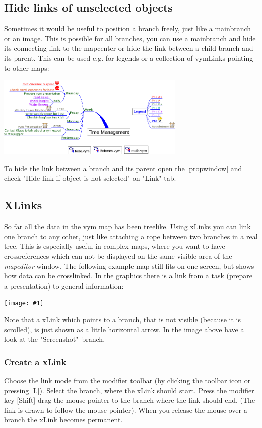 \documentclass[12pt,a4paper]{article}
\newcommand{\maximage}[1]{  
    \begin{center}
        \texttt{[image: \#1]} 
    \end{center}
}
\newcommand{\vym}{{\sc vym }}
\newcommand{\key}[1]{[#1]}
\begin{document}
\subsection{Hide links of unselected objects} \label{hidelink}
Sometimes it would be useful to position a branch freely, just like a
mainbranch or an image. This is possible for all branches, you can use a
mainbranch and hide its connecting link to the mapcenter or hide the
link between a child branch and its parent. This can be used e.g. for
legends or a collection of vymLinks pointing to other maps:
\begin{center}
    \includegraphics[width=9cm]{images/hiddenlink.png}
\end{center}
To hide the link between a branch and its parent open the
\ref{propwindow} and check "Hide link if object is not selected" on
"Link" tab.


\subsection{XLinks} \label{xlinks}
So far all the data in the \vym map has been treelike. Using xLinks you
can link one branch to any other, just like attaching a rope between two
branches in a real tree. This is especially useful in complex maps,
where you want to have crossreferences which can not be displayed on the
same visible area of the {\em mapeditor} window. The following example
map still fits on one screen, but shows how data can be crosslinked. In
the graphics there is a link from a task (prepare a presentation) to
general information: 
\maximage{images/xlink-control.png}
Note that a xLink which points to a branch, that is not visible (because
it is scrolled), is just shown as a little horizontal arrow. In the
image above have a look at the "Screenshot"\ branch.

\subsubsection*{Create a xLink}
Choose the link mode from the modifier toolbar (by clicking the toolbar
icon or pressing \key{L}). Select the branch, where the xLink should
start. Press the modifier key \key{Shift} 
drag the mouse pointer to the branch where the link should end. (The
link is drawn to follow the mouse pointer). When you release the mouse
over a branch the xLink becomes permanent.
\end{document}

